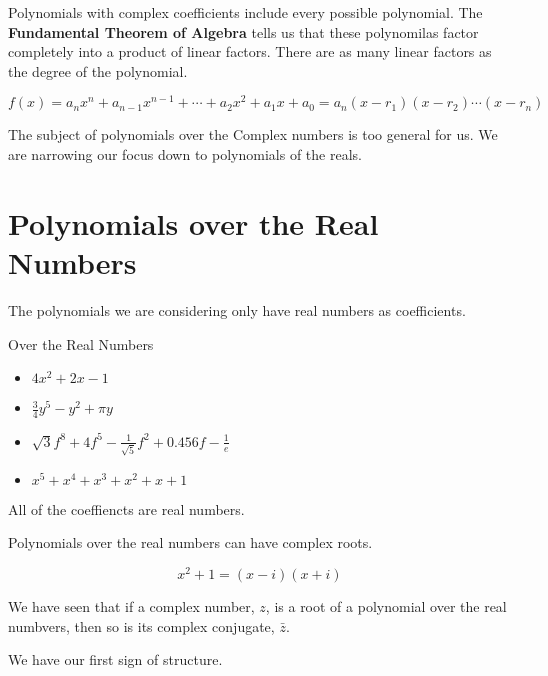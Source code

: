 \documentclass{ximera}
\begin{document}
Polynomials with complex coefficients include every possible polynomial.  The \textbf{Fundamental Theorem of Algebra} tells us that these polynomilas factor completely into a product of linear factors. There are as many linear factors as the degree of the polynomial.



\[   f(x) = a_n x^n + a_{n-1} x^{n-1} + \cdots + a_2 x^2 + a_1 x + a_0   =   a_n (x - r_1) (x - r_2) \cdots (x - r_n)  \]


The subject of polynomials over the Complex numbers is too general for us.  We are narrowing our focus down to polynomials of the reals.




\section{Polynomials over the Real Numbers}


The polynomials we are considering only have real numbers as coefficients.


\begin{example} Over the Real Numbers



\begin{itemize}
\item $4 x^2 + 2 x -1$
\item $\frac{3}{4} y^5 - y^2 + \pi y$
\item $\sqrt{3} f^8 + 4 f^5 - \frac{1}{\sqrt{5}} f^2 + 0.456 f - \frac{1}{e}$
\item $x^5 + x^4 + x^3 + x^2 + x + 1$
\end{itemize}



\end{example}






All of the coeffiencts are real numbers.



Polynomials over the real numbers can have complex roots.

\[  x^2 + 1 = (x - i)(x + i)       \]



We have seen that if a complex number, $z$, is a root of a polynomial over the real numbvers, then so is its complex conjugate, $\bar{z}$.

We have our first sign of structure.
\end{document}
